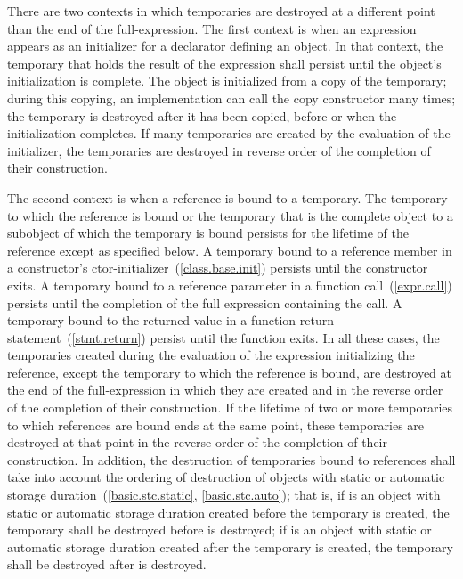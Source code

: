 \pnum
{}%
%
There are two contexts in which temporaries are destroyed at a different
point than the end of the full-expression.
The first context is when an expression appears as an initializer for a
declarator defining an object. In that context, the temporary that holds
the result of the expression shall persist until the object's initialization
is complete. The object is initialized from a copy of the temporary; during
this copying, an implementation can call the copy constructor many times;
the temporary is destroyed after it has been copied, before or when the
initialization completes. If many temporaries are created by the evaluation
of the initializer, the temporaries are destroyed in reverse order of the
completion of their construction.

\pnum
The second context is when a reference is bound to a temporary.
The temporary to which the reference is bound or the temporary
that is the complete object to a subobject of which the temporary is bound
persists for the lifetime of the reference except as specified below.
A temporary bound to a reference member in a constructor's
ctor-initializer~(\ref{class.base.init}) persists until the constructor exits.
A temporary bound to a reference parameter in a function call~(\ref{expr.call})
persists until the completion of the full expression containing the call.
A temporary bound to the returned value in a function return
statement~(\ref{stmt.return}) persist until the function exits.
In all these cases, the temporaries created during the evaluation of the
expression initializing the reference, except the temporary to which the
reference is bound, are destroyed at the end of the full-expression in which
they are created and in the reverse order of the completion of their
construction.
If the lifetime of two or more temporaries to which references are bound ends
at the same point,
these temporaries are destroyed at that point in the reverse order of the
completion of their construction.
In addition, the destruction of temporaries bound to references shall
take into account the ordering of destruction of objects with static or
automatic storage duration~(\ref{basic.stc.static}, \ref{basic.stc.auto});
that is, if  is an object with static or automatic storage
duration created before the temporary is created,
the temporary shall be destroyed before
is destroyed;
if
is an object with static or automatic storage duration created after the
temporary is created, the temporary shall be destroyed after
is destroyed.
\enterexample

